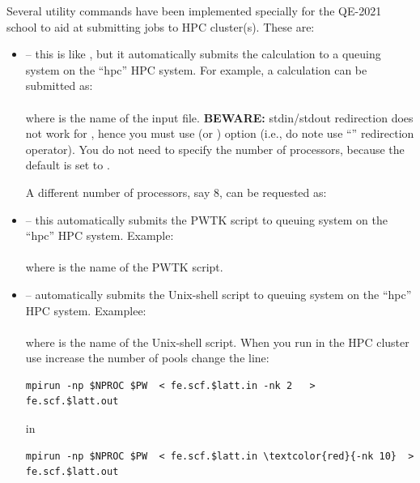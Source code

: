 \documentclass[landscape]{foils}
\begin{document}
\rightheader{}

Several utility commands have been implemented specially for the
QE-2021 school to aid at submitting jobs to HPC cluster(s). These are:
{\small
\begin{itemize}
\item {} -- this is like , but it
  automatically submits the calculation to a queuing system on the
  ``hpc'' HPC system. For example, a  calculation can be
  submitted
  as:\\[0.5em]
  \\[0.5em]
  where  is the name of the  input
  file. {\bf BEWARE:} stdin/stdout redirection does not work for
  , hence you must use  (or )
  option (i.e., do note use ``\cmd{<}'' redirection operator). You do
  not need to specify the number of processors, because the default is
  set to .

  A different number of processors, say 8, can be requested
  as:\\[0.5em]
  \vspace{0.5em}
  
\item {} -- this automatically submits the PWTK
  script to queuing system on the ``hpc'' HPC system. Example:\\[0.5em]
  \\[0.5em]
  where  is the name of the PWTK script.
  \vspace{0.5em}
\clearpage
\item {} -- automatically submits the Unix-shell
  script to queuing system on the ``hpc''  HPC system. Examplee:\\[0.5em]
  \\[0.5em]
  where  is the name of the Unix-shell script.
  When you run in the HPC cluster use increase the number of pools
  change  the line: 
        \vspace{0.5em}
	\begin{Verbatim}[commandchars=\\\{\}]
	mpirun -np $NPROC $PW  < fe.scf.$latt.in -nk 2   >  fe.scf.$latt.out
	\end{Verbatim}
  in 
	\begin{Verbatim}[commandchars=\\\{\}]
	mpirun -np $NPROC $PW  < fe.scf.$latt.in \textcolor{red}{-nk 10}  >  fe.scf.$latt.out
	\end{Verbatim}
	        

\end{itemize}}
\end{document}
